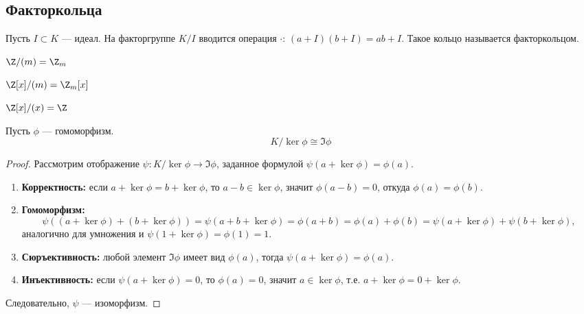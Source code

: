 \subsection{Факторкольца}

\begin{definition}
    Пусть \(I \subset K\) --- идеал. На факторгруппе \(K/I\) вводится операция \(\cdot\): \((a + I)(b + I) = ab + I\). Такое кольцо называется факторкольцом.
\end{definition}

\begin{example}
    \(\Z/(m) = \Z_m\)
\end{example}

\begin{example}
    \(\Z[x]/(m) = \Z_m[x]\)
\end{example}

\begin{example}
    \(\Z[x]/(x) = \Z\)
\end{example}
\begin{theorem}
    Пусть \(\phi\) --- гомоморфизм.
    \[K/{\ker\phi}\cong\Im \phi\]
\end{theorem}
\begin{proof}
    Рассмотрим отображение \(\psi: K/\ker\phi \to \Im\phi\), заданное формулой \(\psi(a + \ker\phi) = \phi(a)\). 
    \begin{enumerate}
        \item \textbf{Корректность:} если \(a + \ker\phi = b + \ker\phi\), то \(a-b \in \ker\phi\), значит \(\phi(a-b)=0\), откуда \(\phi(a)=\phi(b)\).
        \item \textbf{Гомоморфизм:} 
        \[
        \psi((a+\ker\phi)+(b+\ker\phi)) = \psi(a+b+\ker\phi) = \phi(a+b) = \phi(a)+\phi(b) = \psi(a+\ker\phi)+\psi(b+\ker\phi),
        \]
        аналогично для умножения и \(\psi(1+\ker\phi)=\phi(1)=1\).
        \item \textbf{Сюръективность:} любой элемент \(\Im\phi\) имеет вид \(\phi(a)\), тогда \(\psi(a+\ker\phi)=\phi(a)\).
        \item \textbf{Инъективность:} если \(\psi(a+\ker\phi)=0\), то \(\phi(a)=0\), значит \(a\in\ker\phi\), т.е. \(a+\ker\phi = 0+\ker\phi\).
    \end{enumerate}
    Следовательно, \(\psi\) — изоморфизм.
\end{proof}

